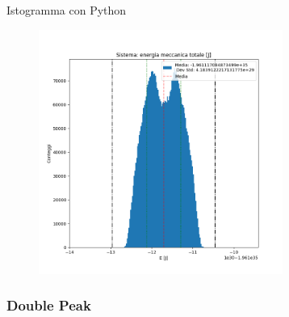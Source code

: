         \begin{frame}{Istogramma con Python}
            \begin{figure}
                \centering
                \includegraphics[height=8cm]{4_energia/E_500_3600_py-.png}
            \end{figure}
        \end{frame}

        \subsubsection[DP]{Double Peak}
            

